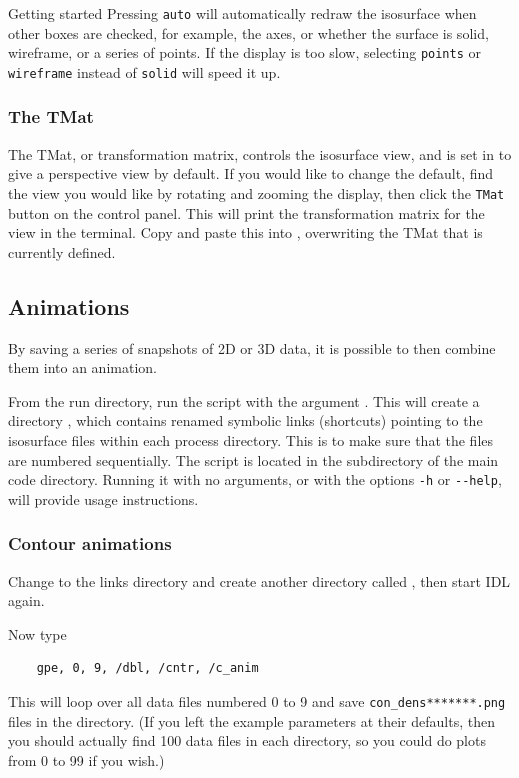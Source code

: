 \begin{chapter}{\label{cha:quickstart}Getting started}
  Pressing \verb"auto" will automatically redraw the isosurface when other
  boxes are checked, for example, the axes, or whether the surface is solid,
  wireframe, or a series of points.  If the display is too slow, selecting
  \verb"points" or \verb"wireframe" instead of \verb"solid" will speed it up.

  \subsubsection{The TMat}
  The TMat, or transformation matrix, controls the isosurface view, and is set
  in  to give a perspective view by default.  If you would
  like to change the default, find the view you would like by rotating and
  zooming the display, then click the \verb"TMat" button on the control panel.
  This will print the transformation matrix for the view in the terminal.  Copy
  and paste this into , overwriting the TMat that is currently
  defined.

  \subsection{Animations}
  By saving a series of snapshots of 2D or 3D data, it is possible to then
  combine them into an animation.

  From the run directory, run the script  with the
  argument .  This will create a directory ,
  which contains renamed symbolic links (shortcuts) pointing to the isosurface
  files within each process directory.  This is to make sure that the files are
  numbered sequentially.  The  script is located in the
   subdirectory of the main code directory.  Running it  with
  no arguments, or with the options \verb"-h" or \verb"--help", will provide
  usage instructions.

  \subsubsection{Contour animations}
  Change to the links directory and create another directory called
  , then start IDL again.

  Now type
  \begin{Verbatim}
    gpe, 0, 9, /dbl, /cntr, /c_anim
  \end{Verbatim}
  This will loop over all data files numbered 0 to 9 and save
  \verb"con_dens*******.png" files in the  directory.  (If you
  left the  example parameters at their defaults, then you
  should actually find 100 data files in each  directory, so you
  could do plots from 0 to 99 if you wish.)


\end{chapter}

